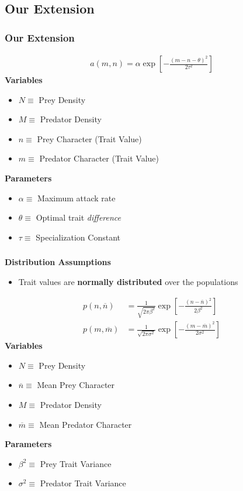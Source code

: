 \documentclass[10pt]{beamer}
\begin{document}
\subsection{Our Extension}
\begin{frame}
	\frametitle{Our Extension}
	\begin{align*}
		a(m, n) = \alpha \exp\left[-\frac{(m - n - \theta)^2}{2\tau^2}\right]
	\end{align*}
	{\bf Variables}
	\begin{itemize}
		\item $N \equiv $ Prey Density
		\item $M \equiv $ Predator Density
		\item $n \equiv $ Prey Character (Trait Value)
		\item $m \equiv $ Predator Character (Trait Value)
	\end{itemize}
	{\bf Parameters}
	\begin{itemize}
		\item $\alpha \equiv $ Maximum attack rate
		\item $\theta \equiv $ Optimal trait {\color{red}\it difference}
		\item $\tau \equiv $ Specialization Constant
	\end{itemize}
\end{frame}
\begin{frame}
	\frametitle{}
	{\bf Distribution Assumptions}
	\begin{itemize}
		\item Trait values are {\bf normally distributed} over the populations
	\end{itemize}
	\begin{align*}
		p(n, \overline{n}) &= \frac{1}{\sqrt{2\pi\beta^2}}\exp\left[{-\frac{(n - \overline{n})^2}{2\beta^2}}\right] \\
		p(m, \overline{m}) &= \frac{1}{\sqrt{2\pi\sigma^2}}\exp\left[{-\frac{(m - \overline{m})^2}{2\sigma^2}}\right]
	\end{align*}
	{\bf Variables}
	\begin{itemize}
		\item $N \equiv $ Prey Density
		\item $\overline{n} \equiv $ Mean Prey Character
		\item $M \equiv $ Predator Density
		\item $\overline{m} \equiv $ Mean Predator Character
	\end{itemize}
	{\bf Parameters}
	\begin{itemize}
		\item $\beta^2 \equiv $ Prey Trait Variance
		\item $\sigma^2 \equiv $ Predator Trait Variance
	\end{itemize}
\end{frame}
\end{document}
